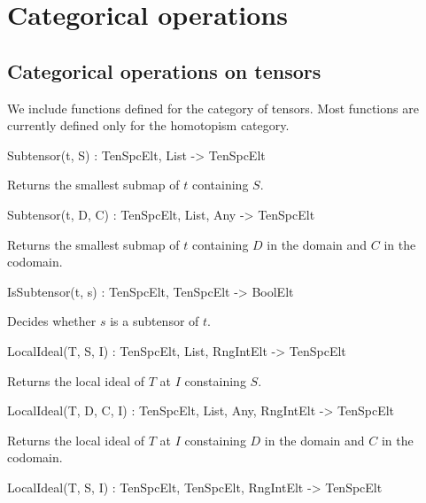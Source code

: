 \section{Categorical operations}

\subsection{Categorical operations on tensors}

We include functions defined for the category of tensors.
Most functions are currently defined only for the homotopism category.

\begin{intrinsics}
Subtensor(t, S) : TenSpcElt, List -> TenSpcElt
\end{intrinsics}

Returns the smallest submap of $t$ containing $S$.

\begin{intrinsics}
Subtensor(t, D, C) : TenSpcElt, List, Any -> TenSpcElt
\end{intrinsics}

Returns the smallest submap of $t$ containing $D$ in the domain and $C$ in the 
codomain.

\begin{intrinsics}
IsSubtensor(t, s) : TenSpcElt, TenSpcElt -> BoolElt
\end{intrinsics}

Decides whether $s$ is a subtensor of $t$.

\begin{example}[Subtensors]

\end{example}


\begin{intrinsics}
LocalIdeal(T, S, I) : TenSpcElt, List, {RngIntElt} -> TenSpcElt
\end{intrinsics}

Returns the local ideal of $T$ at $I$ constaining $S$.

\begin{intrinsics}
LocalIdeal(T, D, C, I) : TenSpcElt, List, Any, {RngIntElt} -> TenSpcElt
\end{intrinsics}

Returns the local ideal of $T$ at $I$ constaining $D$ in the domain and $C$ 
in the codomain.

\begin{intrinsics}
LocalIdeal(T, S, I) : TenSpcElt, TenSpcElt, {RngIntElt} -> TenSpcElt
\end{intrinsics}

